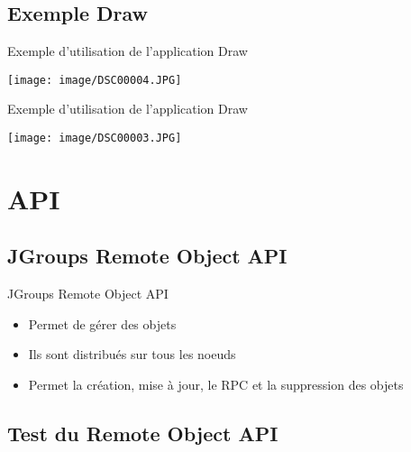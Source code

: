 \documentclass{beamer}
\begin{document}
\subsection{Exemple Draw}

\begin{frame}
  \begin{block}{Exemple d'utilisation de l'application Draw}
    \begin{center}
      \texttt{[image: image/DSC00004.JPG]}
    \end{center}
  \end{block}
\end{frame}

\begin{frame}
  \begin{block}{Exemple d'utilisation de l'application Draw}
    \begin{center}
      \texttt{[image: image/DSC00003.JPG]}
    \end{center}
  \end{block}
\end{frame}



\section{API}

\begin{frame}
  \tableofcontents[currentsection]
\end{frame}

\subsection{JGroups Remote Object API}

\begin{frame}
  \begin{block}{JGroups Remote Object API}
    \begin{itemize}
      \item Permet de gérer des objets
      \item Ils sont distribués sur tous les noeuds
      \item Permet la création, mise à jour, le RPC et la suppression des objets
    \end{itemize}
  \end{block}
\end{frame}

\subsection{Test du Remote Object API}
\end{document}
